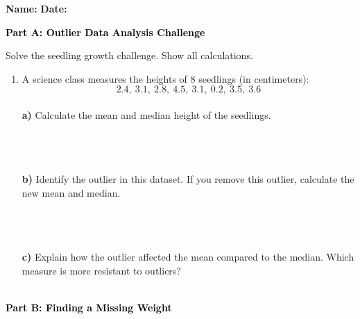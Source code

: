 \documentclass[12pt, letterpaper, fleqn]{article}
\begin{document}
\textbf{Name:} \underline{\hspace{5cm}}
\hfill
\textbf{Date:} \underline{\hspace{3cm}}\\

\begin{tcolorbox}[colback=black!10]
    \large\textcolor{black}{\textbf{Part A: Outlier Data Analysis Challenge}}
\end{tcolorbox}

\vspace{3mm}

\noindent
Solve the seedling growth challenge. Show all calculations.

\vspace{5mm}

\begin{enumerate}[itemsep=2.2cm, leftmargin=0.6cm]
\item A science class measures the heights of 8 seedlings (in centimeters): \\
$$2.4, \ 3.1, \ 2.8, \ 4.5, \ 3.1, \ 0.2, \ 3.5, \ 3.6$$ \\
\textbf{a)} Calculate the mean and median height of the seedlings.  \\ \\
 \\ \\
\vspace{2cm}

\textbf{b)} Identify the outlier in this dataset. If you remove this outlier, calculate the new mean and median. \\ \\
\\ \\
\vspace{2cm}

\textbf{c)} Explain how the outlier affected the mean compared to the median. Which measure is more resistant to outliers? \\ \\

\end{enumerate}

\newpage

\begin{tcolorbox}[colback=black!10]
    \large\textcolor{black}{\textbf{Part B: Finding a Missing Weight}}
\end{tcolorbox}
\end{document}
